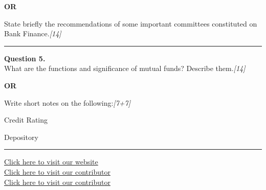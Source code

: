\documentclass[11pt,a4paper]{article}
\newcommand{\pts}[1]{\hfill   \textit{[#1]}}
\begin{document}
\centerline{   \textbf{OR}}

State briefly the recommendations of some important committees constituted on Bank Finance.\pts{14}

\medskip\rule{\linewidth}{0.2pt}




\noindent   \textbf{Question 5.} \\
What are the functions and significance of mutual funds? Describe them.\pts{14}

\centerline{   \textbf{OR}}

Write short notes on the following:\pts{7+7}

\begin{parts}
  \item Credit Rating
  \item Depository
\end{parts}

\vfill
\rule{\linewidth}{0.4pt}

\begin{center}\small
  \href{https://bhu-exam.vercel.app/}{Click here to visit our website}\\[4pt]
  \href{https://me-aryan.vercel.app/}{Click here to visit our contributor}\\[4pt]
  \href{https://quashan-me.vercel.app/}{Click here to visit our contributor}
\end{center}
\end{document}
